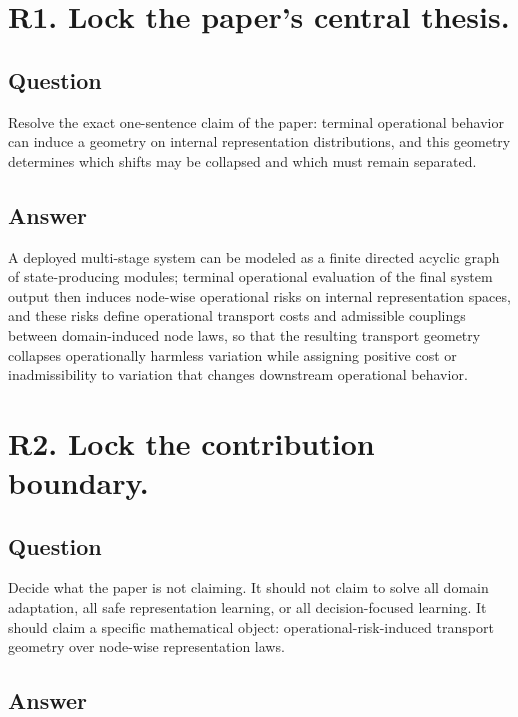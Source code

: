 \documentclass[11pt,a4paper]{article}
\begin{document}
\section*{R1. Lock the paper's central thesis.}

\subsection*{Question}

Resolve the exact one-sentence claim of the paper: terminal operational behavior can induce a geometry on internal representation distributions, and this geometry determines which shifts may be collapsed and which must remain separated.

\subsection*{Answer}

A deployed multi-stage system can be modeled as a finite directed acyclic graph of state-producing modules; terminal operational evaluation of the final system output then induces node-wise operational risks on internal representation spaces, and these risks define operational transport costs and admissible couplings between domain-induced node laws, so that the resulting transport geometry collapses operationally harmless variation while assigning positive cost or inadmissibility to variation that changes downstream operational behavior.

\section*{R2. Lock the contribution boundary.}

\subsection*{Question}

Decide what the paper is not claiming. It should not claim to solve all domain adaptation, all safe representation learning, or all decision-focused learning. It should claim a specific mathematical object: operational-risk-induced transport geometry over node-wise representation laws.

\subsection*{Answer}
\end{document}
